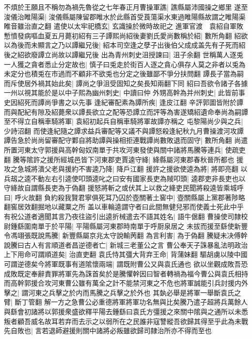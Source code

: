 不煩於王願且不稱勿為禍先魯從之七年春正月曹操軍譙|{
	譙縣屬沛國操之鄉里}
遂至浚儀治睢陽渠|{
	浚儀縣屬陳留郡睢水於此縣首受莨蕩渠水東過睢陽縣故謂之睢陽渠睢音雖治直之翻}
遣使以太牢祀橋玄|{
	玄識操於微時故祀之}
進軍官渡　袁紹自軍敗慙憤發病嘔血夏五月薨初紹有三子譚熙尚紹後妻劉氏愛尚數稱於紹|{
	數所角翻}
紹欲以為後而未顯言之乃以譚繼兄後|{
	紹本司空逢之孽子出後伯父成成盖先有子死而紹後之紹欲廢譚立尚故以譚繼兄後}
出為青州刺史沮授諫曰|{
	沮子余翻}
世稱萬人逐兎一人獲之貪者悉止分定故也|{
	慎子曰兎走於街百人逐之貪心俱存人莫之非者以兎為未定分也積兎在市過而不顧非不欲兎也分定之後雖鄙不爭分扶問翻}
譚長子當為嗣而斥使居外禍其始此矣|{
	譚尚之爭沮受固知之矣長知兩翻下同}
紹曰吾欲令諸子各據一州以視其能於是以中子熙為幽州刺史|{
	中讀曰仲}
外甥高幹為并州刺史|{
	此皆前事史因紹死而譚尚爭書之以先事}
逢紀審配素為譚所疾|{
	逢皮江翻}
辛評郭圖皆附於譚而與配紀有隙及紹薨衆以譚長欲立之配等恐譚立而評等為害遂矯紹遺命奉尚為嗣譚至不得立自稱車騎將軍|{
	袁紹初起兵自稱車騎將軍故譚亦稱之}
屯黎陽尚少與之兵|{
	少詩沼翻}
而使逢紀隨之譚求益兵審配等又議不與譚怒殺逢紀秋九月曹操渡河攻譚譚告急於尚尚留審配守鄴自將助譚與操相拒連戰譚尚數敗退而固守|{
	數所角翻}
尚遣所置河東太守郭援與高幹匈奴南單于共攻河東發使與關中諸將馬騰等連兵|{
	使疏吏翻}
騰等隂許之援所經城邑皆下河東郡吏賈逵守絳|{
	絳縣屬河東郡春秋晉所都也}
援攻之急城將潰父老與援約不害逵乃降|{
	降戶江翻}
援許之援欲使逵為將|{
	將即亮翻}
以兵刼之逵不動左右引逵使叩頭逵叱之曰安有國家長吏為賊叩頭|{
	逵郡吏非長吏也以守絳故自謂縣長吏為于偽翻}
援怒將斬之或伏其上以救之絳吏民聞將殺逵皆乘城呼曰|{
	呼火故翻}
負約殺我賢君寧俱死耳乃囚於壺關著土窖中|{
	壺關縣屬上黨郡著陟略翻窖居效翻掘地以藏粟之所}
盖以車輪逵謂守者曰此間無健兒邪而使義士死此中乎有祝公道者適聞其言乃夜往盜引出逵折械遣去不語其姓名|{
	語牛倨翻}
曹操使司隸校尉鍾繇圍南單于於平陽|{
	平陽縣屬河東郡時南單于呼㕑泉居之}
未拔而援至繇使新豐令馮翊張既說馬騰|{
	新豐縣屬京兆太守說輸苪翻}
為言利害|{
	為于偽翻}
騰疑未决傅幹說騰曰古人有言順道者昌逆德者亡|{
	新城三老董公之言}
曹公奉天子誅暴亂法明政治上下用命可謂順道矣|{
	治直吏翻}
袁氏恃其彊大背弃王命|{
	背蒲妹翻}
驅胡虜以陵中國可謂逆德矣今將軍既事有道隂懷兩端|{
	謂既附曹公又與袁氏通也}
欲以坐觀成敗吾恐成敗既定奉辭責罪將軍先為誅首矣於是騰懼幹因曰智者轉禍為福今曹公與袁氏相持而高幹郭援合攻河東曹公雖有萬全之計不能禁河東之不危也將軍誠能引兵討援内外擊之|{
	謂河東之兵擊之於内而馬騰之兵擊之於外也}
其埶必舉是將軍一舉斷袁氏之臂|{
	斷丁管翻}
解一方之急曹公必重德將軍將軍功名無與比矣騰乃遣子超將兵萬餘人與繇會初諸將以郭援衆盛欲釋平陽去鍾繇曰袁氏方彊援之來關中隂與之通所以未悉叛者顧吾威名故耳若弃而去示之以弱所在之民誰非寇讐縱吾欲歸其得至乎此為未戰先自敗也|{
	言若退師避援則關中諸將必叛雖欲歸司隸治所亦不得而至也}
